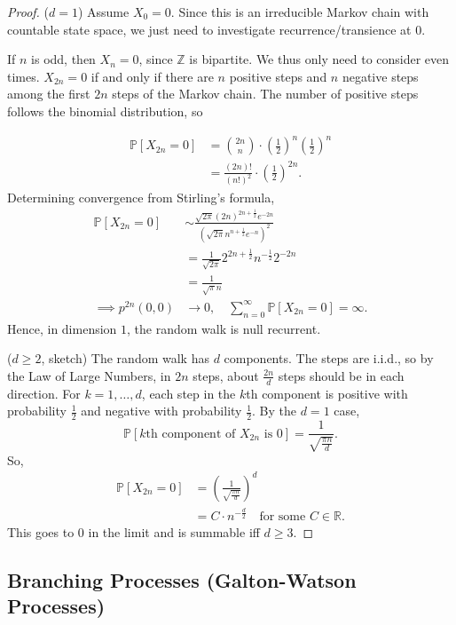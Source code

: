 \documentclass{tufte-handout}
\newcommand*\R{\mathbb{R}}
\newcommand*\Z{\mathbb{Z}}
\renewcommand*\P{\mathbb{P}}
\theoremstyle{definition}
\begin{document}
\begin{proof}
	($d=1$) Assume $X_0 = 0$. Since this is an irreducible Markov chain with countable state space, we just need to investigate recurrence/transience at 0. 

	If $n$ is odd, then $X_n = 0$, since $\Z$ is bipartite. We thus only need to consider even times. $X_{2n} = 0$ if and only if there are $n$ positive steps and $n$ negative steps among the first $2n$ steps of the Markov chain. The number of positive steps follows the binomial distribution, so

	\begin{align*}
		\P\left[X_{2n} = 0\right] &= \binom{2n}{n} \cdot \left( \frac{1}{2} \right)^{n} \left( \frac{1}{2} \right)^{n} \\
								  &= \frac{\left( 2n \right)!}{\left( n! \right)^2} \cdot \left( \frac{1}{2} \right)^{2n} 
	.\end{align*}
	Determining convergence from Stirling's formula,
	\begin{align*}
		\P\left[X_{2n} = 0\right] &\sim \frac{\sqrt{2\pi} \left( 2n \right)^{2n + \frac{1}{2}}e^{-2n}}{\left( \sqrt{2\pi} n^{n+\frac{1}{2}}e^{-n} \right)^2} \\
		&= \frac{1}{\sqrt{2\pi} } 2^{2n + \frac{1}{2}}n^{-\frac{1}{2}}2^{-2n} \\
		&=\frac{1}{\sqrt{\pi}n } \\
		\implies p^{2n}(0,0) &\to 0, \quad \sum\limits_{n=0}^{\infty} \P\left[X_{2n} = 0\right] = \infty
	.\end{align*}
	Hence, in dimension $1$, the random walk is null recurrent.

	($d\ge 2$, sketch) The random walk has $d$ components. The steps are i.i.d., so by the Law of Large Numbers, in $2n$ steps, about $\frac{2n}{d}$ steps should be in each direction. For $k=1,\ldots,d$, each step in the $k$th component is positive with probability $\frac{1}{2}$ and negative with probability $\frac{1}{2}$. By the $d=1$ case, \[
		\P\left[k\text{th component of $X_{2n}$ is } 0\right] = \frac{1}{\sqrt{\frac{\pi n}{d}} }
	.\] So,
	\begin{align*}
		\P\left[X_{2n} = 0\right] &= \left( \frac{1}{\sqrt{\frac{\pi n}{d}} } \right)^{d} \\
								  &= C \cdot n^{-\frac{d}{2}}\quad \text{for some $C \in \R$}
	.\end{align*}
	This goes to $0$ in the limit and is summable iff $d\ge 3$.
\end{proof}

\subsection{Branching Processes (Galton-Watson Processes)}
\end{document}
